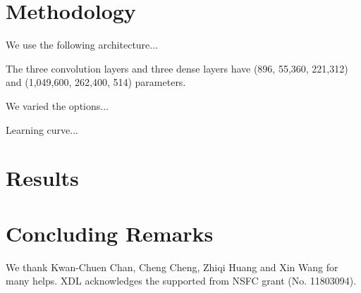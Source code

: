 \documentclass[twocolumn]{aastex61}
\begin{document}
\section{Methodology}
\label{sec:method}

We use the following architecture...

The three convolution layers and three dense layers
have (896, 55,360, 221,312) and (1,049,600, 262,400, 514) parameters.

We varied the options...

Learning curve...




\section{Results}\label{sec:results}







\section{Concluding Remarks}\label{sec:conclusion}




\acknowledgments


We thank Kwan-Chuen Chan, Cheng Cheng, Zhiqi Huang and  Xin Wang for many helps.
XDL acknowledges the supported from NSFC grant (No. 11803094). 
\end{document}
